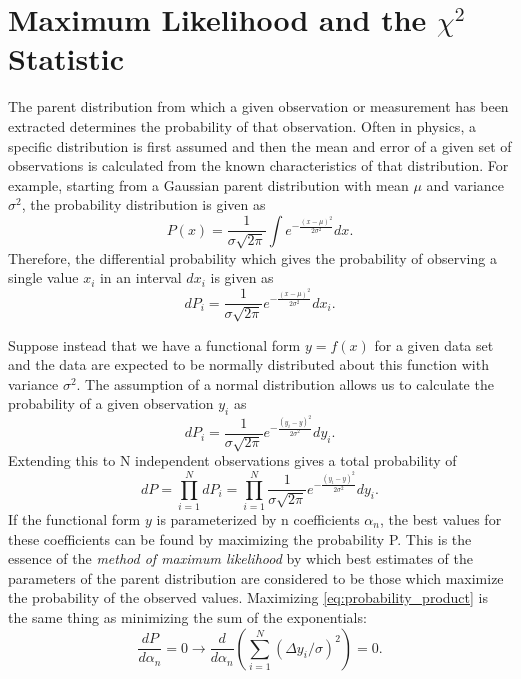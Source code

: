 
\chapter{Maximum Likelihood and the $\chi^2$ Statistic} 
\captionsetup{justification=justified,singlelinecheck=false}

\label{AppendixA} 


The parent distribution from which a given observation or measurement has been extracted determines the probability of that observation. Often in physics, a specific distribution is first assumed and then the mean and error of a given set of observations is calculated from the known characteristics of that distribution. For example, starting from a Gaussian parent distribution with mean $\mu$ and variance $\sigma^2$, the probability distribution is given as 
\begin{equation}
P(x)=\frac{1}{\sigma\sqrt{2\pi}}\int e^{-\frac{(x-\mu)^2}{2\sigma^2}}dx.
\label{eq:gaussian_pdf}
\end{equation}
Therefore, the differential probability which gives the probability of observing a single value $x_i$ in an interval $dx_i$ is given as 
\begin{equation}
dP_i=\frac{1}{\sigma\sqrt{2\pi}}e^{-\frac{(x-\mu)^2}{2\sigma^2}}dx_i.
\end{equation}

Suppose instead that we have a functional form $y=f(x)$ for a given data set and the data are expected to be normally distributed about this function with variance $\sigma^2$. The assumption of a normal distribution allows us to calculate the probability of a given observation $y_i$ as
\begin{equation}
dP_i=\frac{1}{\sigma\sqrt{2\pi}}e^{-\frac{(y_i-y)^2}{2\sigma^2}}dy_i.
\label{eq:differential_probability}
\end{equation}
Extending this to N independent observations gives a total probability of 
\begin{equation}
dP=\prod_{i=1}^NdP_i=\prod_{i=1}^N\frac{1}{\sigma\sqrt{2\pi}}e^{-\frac{(y_i-y)^2}{2\sigma^2}}dy_i.
\label{eq:probability_product}
\end{equation}
If the functional form $y$ is parameterized by n coefficients $\alpha_n$, the best values for these coefficients can be found by maximizing the probability P. This is the essence of the \emph{method of maximum likelihood} by which best estimates of the parameters of the parent distribution are considered to be those which maximize the probability of the observed values. Maximizing \ref{eq:probability_product} is the same thing as minimizing the sum of the exponentials:
\[
\frac{dP}{d\alpha_n}=0\longrightarrow\frac{d}{d\alpha_n}\left(\sum_{i=1}^N(\Delta y_i/\sigma)^2\right)=0.
\]


